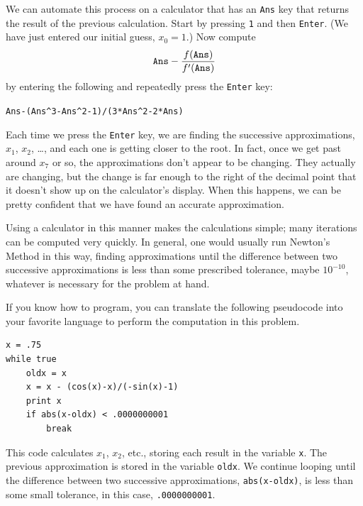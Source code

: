 We can automate this process on a calculator that has an \verb+Ans+ key that returns the result of the previous calculation.  Start by pressing \verb+1+ and then \texttt{Enter}. (We have just entered our initial guess, $x_0=1$.)  Now  compute 
$$\text{\tt Ans} - \frac{f(\text{\tt Ans})}{f'(\text{\tt Ans})}$$ 
by entering the following and repeatedly press the \texttt{Enter} key:
\begin{center}
\verb+Ans-(Ans^3-Ans^2-1)/(3*Ans^2-2*Ans)+
\end{center}
Each time we press the \texttt{Enter} key, we are finding the successive approximations, $x_1$, $x_2$, \dots, and each one is getting closer to the root.  In fact, once we get past around $x_7$ or so, the approximations don't appear to be changing.  They actually are changing, but the change is far enough to the right of the decimal point that it doesn't show up on the calculator's display.  When this happens, we can be pretty confident that we have found an accurate approximation.

Using a calculator in this manner makes the calculations simple; many iterations can be computed very quickly. In general, one would usually run Newton's Method in this way, finding approximations until the difference between two successive approximations is less than some prescribed tolerance, maybe $10^{-10}$, whatever is necessary for the problem at hand.


If you know how to program, you can translate the following pseudocode into your favorite language to perform the computation in this problem.
\begin{center}
\begin{verbatim}
x = .75
while true
    oldx = x
    x = x - (cos(x)-x)/(-sin(x)-1)
    print x
    if abs(x-oldx) < .0000000001
        break
\end{verbatim}
\end{center}

This code calculates $x_1$, $x_2$, etc., storing each result in the variable \texttt{x}.  The previous approximation is stored in the variable \texttt{oldx}.  We continue looping until the difference between two successive approximations, \texttt{abs(x-oldx)}, is less than some small tolerance, in this case,
\texttt{.0000000001}.

